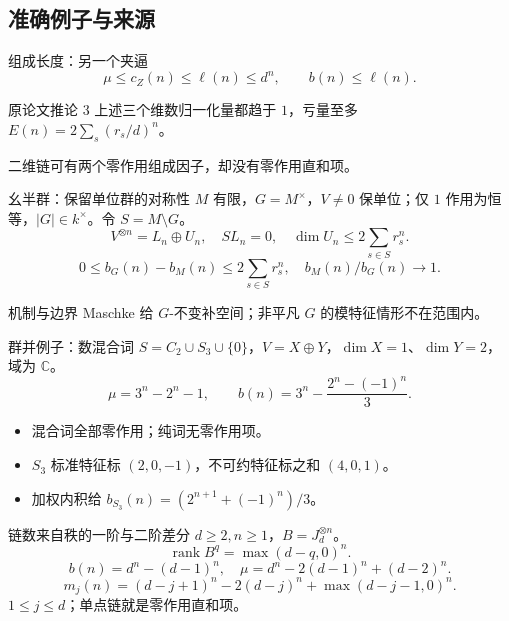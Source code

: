 \documentclass{beamer}
\begin{document}
\subsection{准确例子与来源}
\begin{frame}{组成长度：另一个夹逼}
\[
\mu\leq c_Z(n)\leq\ell(n)\leq d^n,\qquad b(n)\leq\ell(n).
\]
\begin{block}{原论文推论 3}
上述三个维数归一化量都趋于 $1$，亏量至多 $E(n)=2\sum_s(r_s/d)^n$。
\end{block}
二维链可有两个零作用组成因子，却没有零作用直和项。
\end{frame}
\begin{frame}{幺半群：保留单位群的对称性}
\small
$M$ 有限，$G=M^\times$，$V\ne0$ 保单位；仅 $1$ 作用为恒等，$|G|\in k^\times$。令 $S=M\setminus G$。
\[
V^{\otimes n}=L_n\oplus U_n,\quad SL_n=0,\quad
\dim U_n\leq2\sum_{s\in S}r_s^n.
\]
\[
0\leq b_G(n)-b_M(n)\leq2\sum_{s\in S}r_s^n,\quad b_M(n)/b_G(n)\to1.
\]
\begin{block}{机制与边界}
Maschke 给 $G$-不变补空间；非平凡 $G$ 的模特征情形不在范围内。
\end{block}
\end{frame}
\begin{frame}{群并例子：数混合词}
$S=C_2\cup S_3\cup\{0\}$，$V=X\oplus Y$，$\dim X=1$、$\dim Y=2$，域为 $\mathbb C$。
\[
\mu=3^n-2^n-1,\qquad b(n)=3^n-\frac{2^n-(-1)^n}{3}.
\]
\begin{itemize}
\item 混合词全部零作用；纯词无零作用项。
\item $S_3$ 标准特征标 $(2,0,-1)$，不可约特征标之和 $(4,0,1)$。
\item 加权内积给 $b_{S_3}(n)=(2^{n+1}+(-1)^n)/3$。
\end{itemize}
\end{frame}
\begin{frame}{链数来自秩的一阶与二阶差分}
$d\geq2,n\geq1$，$B=J_d^{\otimes n}$。
\[
\operatorname{rank}B^q=\max(d-q,0)^n.
\]
\[
b(n)=d^n-(d-1)^n,\quad \mu=d^n-2(d-1)^n+(d-2)^n.
\]
\[
m_j(n)=(d-j+1)^n-2(d-j)^n+\max(d-j-1,0)^n.
\]
$1\leq j\leq d$；单点链就是零作用直和项。
\end{frame}
\end{document}
